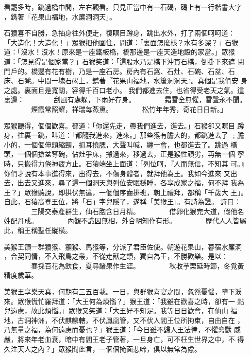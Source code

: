 \begin{pinyinscope}
{看罷多時，跳過橋中間，左右觀看。只見正當中有一石碣，碣上有一行楷書大字
，鐫著「花果山福地，水簾洞洞天」。

石猿喜不自勝，急抽身往外便走，復瞑目蹲身，跳出水外，打了兩個呵呵道：
「大造化！大造化！」眾猴把他圍住，問道：「裏面怎麼樣？水有多深？」石猴
道：「沒水！沒水！原來是一座鐵板橋，橋那邊是一座天造地設的家當。」眾猴
道：「怎見得是個家當？」石猴笑道：「這股水乃是橋下沖貫石橋，倒掛下來遮
閉門戶的。橋邊有花有樹，乃是一座石房。房內有石窩、石灶、石碗、石盆、石
床、石凳。中間一塊石碣上，鐫著『花果山福地，水簾洞洞天』。真個是我們安
身之處。裏面且是寬闊，容得千百口老小。
我們都進去住，也省得受老天之氣。這裏邊：
　　　　刮風有處躲，下雨好存身。
　　　　霜雪全無懼，雷聲永不聞。
　　　　煙霞常照耀，祥瑞每蒸熏。
　　　　松竹年年秀，奇花日日新。」

眾猴聽得，個個歡喜。都道：「你還先走，帶我們進去，進去。」石猴卻又瞑目
蹲身，往裏一跳，叫道：「都隨我進來，進來。」那些猴有膽大的，都跳進去了
﹔膽小的，一個個伸頭縮頸，抓耳撓腮，大聲叫喊，纏一會，也都進去了。跳過
橋頭，一個個搶盆奪碗，佔灶爭床，搬過來，移過去，正是猴性頑劣，再無一個
寧時，只搬得力倦神疲方止。石猿端坐上面道：「列位呵，『人而無信，不知其
可。』你們才說有本事進得來，出得去，不傷身體者，就拜他為王。我如今進來
又出去，出去又進來，尋了這一個洞天與列位安眠穩睡，各享成家之福，何不拜
我為王？」眾猴聽說，即拱伏無違，一個個序齒排班，朝上禮拜，都稱「千歲大
王」。自此，石猿高登王位，將「石」字兒隱了，遂稱「美猴王」。有詩為證。
詩曰：
　　　　三陽交泰產群生，仙石胞含日月精。
　　　　借卵化猴完大道，假他名姓配丹成。
　　　　內觀不識因無相，外合明知作有形。
　　　　歷代人人皆屬此，稱王稱聖任縱橫。

美猴王領一群猿猴、獼猴、馬猴等，分派了君臣佐使。朝遊花果山，暮宿水簾洞
，合契同情，不入飛鳥之叢，不從走獸之類，獨自為王，不勝歡樂。是以：
　　　　春採百花為飲食，夏尋諸果作生涯。
　　　　秋收芋栗延時節，冬覓黃精度歲華。

美猴王享樂天真，何期有三五百載。一日，與群猴喜宴之間，忽然憂惱，墮下淚
來。眾猴慌忙羅拜道：「大王何為煩惱？」猴王道：「我雖在歡喜之時，卻有一
點兒遠慮，故此煩惱。」眾猴又笑道：「大王好不知足。我等日日歡會，在仙山
福地，古洞神洲，不伏麒麟轄，不伏鳳凰管，又不伏人間王位所拘束，自由自在
，乃無量之福，為何遠慮而憂也？」猴王道：「今日雖不歸人王法律，不懼禽獸
威嚴，將來年老血衰，暗中有閻王老子管著，一旦身亡，可不枉生世界之中，不
得久注天人之內？」眾猴聞此言，一個個掩面悲啼，俱以無常為慮。

}
\end{pinyinscope}
